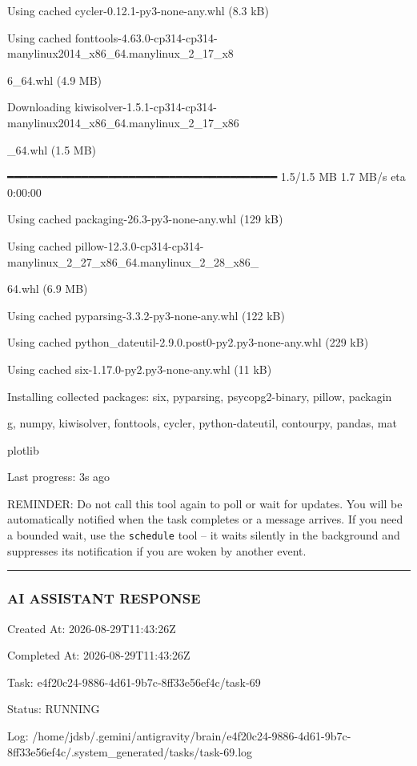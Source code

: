 \documentclass[11pt,a4paper]{article}
\begin{document}
Using cached cycler-0.12.1-py3-none-any.whl (8.3 kB)

Using cached fonttools-4.63.0-cp314-cp314-manylinux2014\_x86\_64.manylinux\_2\_17\_x8

6\_64.whl (4.9 MB)

Downloading kiwisolver-1.5.1-cp314-cp314-manylinux2014\_x86\_64.manylinux\_2\_17\_x86

\_64.whl (1.5 MB)

━━━━━━━━━━━━━━━━━━━━━━━━━━━━━━━━━━━━━━━━ 1.5/1.5 MB 1.7 MB/s eta 0:00:00

Using cached packaging-26.3-py3-none-any.whl (129 kB)

Using cached pillow-12.3.0-cp314-cp314-manylinux\_2\_27\_x86\_64.manylinux\_2\_28\_x86\_

64.whl (6.9 MB)

Using cached pyparsing-3.3.2-py3-none-any.whl (122 kB)

Using cached python\_dateutil-2.9.0.post0-py2.py3-none-any.whl (229 kB)

Using cached six-1.17.0-py2.py3-none-any.whl (11 kB)

Installing collected packages: six, pyparsing, psycopg2-binary, pillow, packagin

g, numpy, kiwisolver, fonttools, cycler, python-dateutil, contourpy, pandas, mat

plotlib


Last progress: 3s ago



REMINDER: Do not call this tool again to poll or wait for updates. You will be automatically notified when the task completes or a message arrives. If you need a bounded wait, use the \texttt{schedule} tool -- it waits silently in the background and suppresses its notification if you are woken by another event.


\hrule

\subsubsection{AI ASSISTANT RESPONSE}

Created At: 2026-08-29T11:43:26Z

Completed At: 2026-08-29T11:43:26Z

Task: e4f20c24-9886-4d61-9b7c-8ff33e56ef4c/task-69

Status: RUNNING

Log: /home/jdsb/.gemini/antigravity/brain/e4f20c24-9886-4d61-9b7c-8ff33e56ef4c/.system\_generated/tasks/task-69.log
\end{document}
